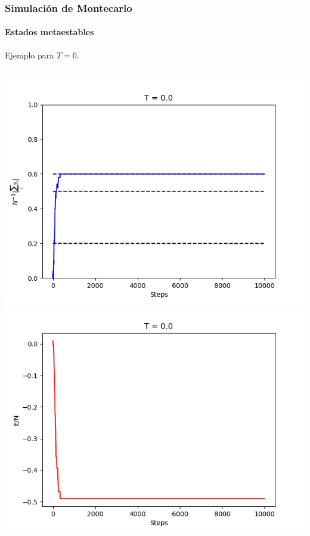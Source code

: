 \documentclass[11pt]{beamer}
\begin{document}
\begin{frame}
\frametitle{Simulación de Montecarlo}
\framesubtitle{Estados metaestables}
Ejemplo para $T = 0$.
\begin{columns}
 \includegraphics[width=\linewidth]{example_magnet.png}
 \includegraphics[width=\linewidth]{example_ener.png}
\end{columns}
\end{frame}
\end{document}
